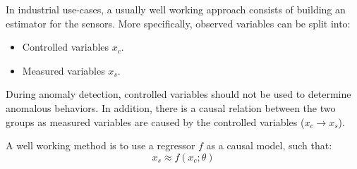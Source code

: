 \begin{remark}
    In industrial use-cases, a usually well working approach consists of building an estimator for the sensors. More specifically, observed variables can be split into:
    \begin{itemize}
        \item Controlled variables $x_c$.
        \item Measured variables $x_s$.
    \end{itemize}
    During anomaly detection, controlled variables should not be used to determine anomalous behaviors. In addition, there is a causal relation between the two groups as measured variables are caused by the controlled variables ($x_c \rightarrow x_s$).

    A well working method is to use a regressor $f$ as a causal model, such that:
    \[ x_s \approx f(x_c; \theta) \]
\end{remark}